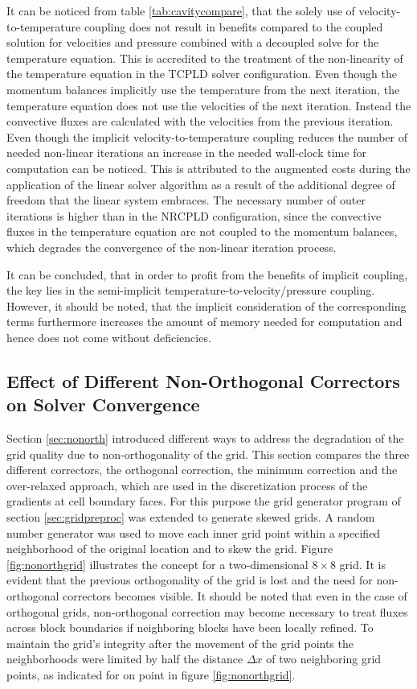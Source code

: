 It can be noticed from table \ref{tab:cavitycompare}, that the solely use of velocity-to-temperature coupling does not result in benefits compared to the coupled solution for velocities and pressure combined with a decoupled solve for the temperature equation. This is accredited to the treatment of the non-linearity of the temperature equation in the TCPLD solver configuration. Even though the momentum balances implicitly use the temperature from the next iteration, the temperature equation does not use the velocities of the next iteration. Instead the convective fluxes are calculated with the velocities from the previous iteration. Even though the implicit velocity-to-temperature coupling reduces the number of needed non-linear iterations an increase in the needed wall-clock time for computation can be noticed. This is attributed to the augmented costs during the application of the linear solver algorithm as a result of the additional degree of freedom that the linear system embraces. The necessary number of outer iterations is higher than in the NRCPLD configuration, since the convective fluxes in the temperature equation are not coupled to the momentum balances, which degrades the convergence of the non-linear iteration process.

It can be concluded, that in order to profit from the benefits of implicit coupling, the key lies in the semi-implicit temperature-to-velocity/pressure coupling. However, it should be noted, that the implicit consideration of the corresponding terms furthermore increases the amount of memory needed for computation and hence does not come without deficiencies.

\subsection{Effect of Different Non-Orthogonal Correctors on Solver Convergence}
\label{sec:studynonorth}

Section \ref{sec:nonorth} introduced different ways to address the degradation of the grid quality due to non-orthogonality of the grid. This section compares the three different correctors, the orthogonal correction, the minimum correction and the over-relaxed approach, which are used in the discretization process of the gradients at cell boundary faces. For this purpose the grid generator program of section \ref{sec:gridpreproc} was extended to generate skewed grids. A random number generator was used to move each inner grid point within a specified neighborhood of the original location and to skew the grid. Figure \ref{fig:nonorthgrid} illustrates the concept for a two-dimensional \(8 \times 8\) grid. It is evident that the previous orthogonality of the grid is lost and the need for non-orthogonal correctors becomes visible. It should be noted that even in the case of orthogonal grids, non-orthogonal correction may become necessary to treat fluxes across block boundaries if neighboring blocks have been locally refined. To maintain the grid's integrity after the movement of the grid points the neighborhoods were limited by half the distance \(\Delta x\) of two neighboring grid points, as indicated for on point in figure \ref{fig:nonorthgrid}.

